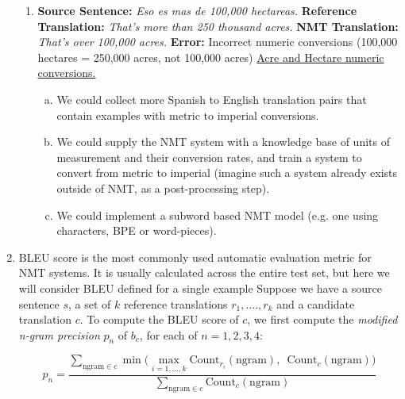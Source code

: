 \begin{enumerate}[1.]
\begin{enumerate}[3a.]

\item {}

{\bf Source Sentence:} {\em Eso es mas de 100,000 hectareas.}
\newline
{\bf Reference Translation:} {\em That's more than 250 thousand acres.}
\newline
{\bf NMT Translation:} {\em That's over 100,000 acres.}
\newline
{\bf Error:} Incorrect numeric conversions (100,000 hectares = 250,000 acres, not 100,000 acres)
\newline
\href{https://www.unitconverters.net/area/acres-to-hectare.htm}{Acre and Hectare numeric conversions.}

\begin{enumerate}[(a)]
\item We could collect more Spanish to English translation pairs that contain examples with metric to imperial conversions.
\item We could supply the NMT system with a knowledge base of units of measurement and their conversion rates, and train a system to convert from metric to imperial (imagine such a system already exists outside of NMT, as a post-processing step).
\item We could implement a subword based NMT model (e.g. one using characters, BPE or word-pieces).
\end{enumerate}


\end{enumerate}

\item 

BLEU score is the most commonly used automatic evaluation metric for NMT systems. It is usually calculated across the entire test set, but here we will consider BLEU defined for a single example Suppose we have a source sentence $s$, a set of $k$ reference translations $r_1,....,r_k$ and a candidate translation $c$. To compute the BLEU score of $c$, we first compute the {\em modified n-gram precision} $p_n$ of $b_c$, for each of $n = 1, 2, 3, 4$:

\begin{equation*}
p_n = \frac{ \displaystyle \sum_{\text{ngram} \in c} \min \bigg( \max_{i=1,\dots,k} \text{Count}_{r_i}(\text{ngram}), \enspace \text{Count}_{c}(\text{ngram}) \bigg) }{\displaystyle \sum_{\text{ngram}\in c} \text{Count}_{c}(\text{ngram})}
\end{equation*}


\end{enumerate}
